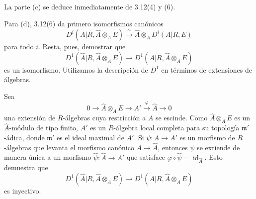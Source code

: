 La parte (c) se deduce inmediatamente de 3.12(4) y (6).


Para (d), 3.12(6) da primero isomorfismos canónicos
\[
 D^i(A|R,\widehat A\otimes_AE)
 \xrightarrow{\ \sim\ }
 \widehat A\otimes_AD^i(A|R,E)
\]
para todo $i$. Resta, pues, demostrar que
\[
 D^1(\widehat A|R,\widehat A\otimes_AE)
 \longrightarrow D^1(A|R,\widehat A\otimes_AE)
\]
es un isomorfismo. Utilizamos la descripción de $D^1$ en términos de
extensiones de álgebras.

Sea
\[
 0\longrightarrow\widehat A\otimes_AE\longrightarrow A'
 \xrightarrow{\ \varphi\ }\widehat A\longrightarrow0
\]
una extensión de $R$-álgebras cuya restricción a $A$ se escinde. Como
$\widehat A\otimes_AE$ es un $\widehat A$-módulo de tipo finito,
$A'$ es un $R$-álgebra local completa para su topología
$\mathfrak m'$-ádica, donde $\mathfrak m'$ es el ideal maximal de
$A'$. Si $\psi:A\longrightarrow A'$ es un morfismo de $R$-álgebras
que levanta el morfismo canónico $A\longrightarrow\widehat A$,
entonces $\psi$ se extiende de manera única a un morfismo
$\widehat\psi:\widehat A\longrightarrow A'$ que satisface
$\varphi\circ\widehat\psi=\operatorname{id}_{\widehat A}$.
Esto demuestra que
\[
 D^1(\widehat A|R,\widehat A\otimes_AE)
 \longrightarrow D^1(A|R,\widehat A\otimes_AE)
\]
es inyectivo.


